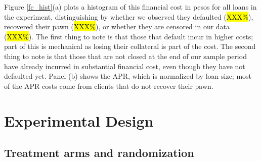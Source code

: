 \documentclass[oneside,11pt]{article}
\begin{document}
\vspace{.1in}

Figure \ref{fc_hist}(a) plots a histogram of this financial cost in pesos for all loans in the experiment, distinguishing by whether we observed they defaulted (\hl{XXX\%}), recovered their pawn (\hl{XXX\%}), or whether they are censored in our data (\hl{XXX\%}). The first thing to note is that those that default incur in higher costs; part of this is mechanical as losing their collateral is part of the cost. The second thing to note is that those that are not closed at the end of our sample period have already incurred in substantial financial cost, even though they have not defaulted yet. Panel (b) shows the APR, which is normalized by loan size; most of the APR costs come from clients that do not recover their pawn. 





\section{Experimental Design} \label{Experiment}

\subsection{Treatment arms and randomization}
\end{document}
